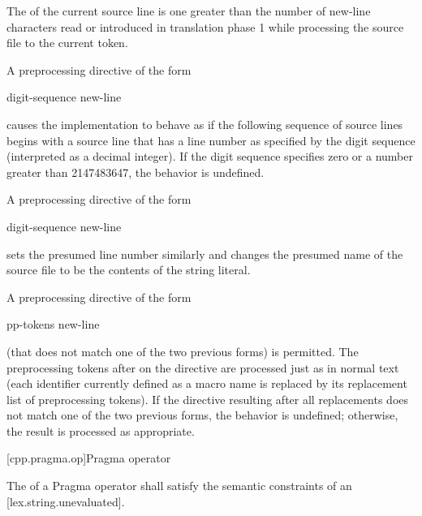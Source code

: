 \documentclass{wg21}
\begin{document}

\pnum
The
of the current source line is one greater than
the number of new-line characters read or introduced
in translation phase 1
while processing the source file to the current token.

\pnum
A preprocessing directive of the form
\begin{ncsimplebnf}
     digit-sequence new-line
\end{ncsimplebnf}
causes the implementation to behave as if
the following sequence of source lines begins with a
source line that has a line number as specified
by the digit sequence (interpreted as a decimal integer).
If the digit sequence specifies zero
or a number greater than 2147483647,
the behavior is undefined.

\pnum
A preprocessing directive of the form

\begin{ncsimplebnf}
     digit-sequence    new-line
\end{ncsimplebnf}

sets the presumed line number similarly and changes the
presumed name of the source file to be the contents
of the  string literal.

\pnum
A preprocessing directive of the form

\begin{ncsimplebnf}
     pp-tokens new-line
\end{ncsimplebnf}

(that does not match one of the two previous forms)
is permitted.
The preprocessing tokens after
on the directive are processed just as in normal text
(each identifier currently defined as a macro name is replaced by its
replacement list of preprocessing tokens).
If the directive resulting after all replacements does not match
one of the two previous forms, the behavior is undefined;
otherwise, the result is processed as appropriate.

[cpp.pragma.op]{Pragma operator}%
%

\begin{addedblock}
The  of a Pragma operator shall satisfy the semantic constraints of an  [lex.string.unevaluated].
\end{addedblock}
\end{document}
